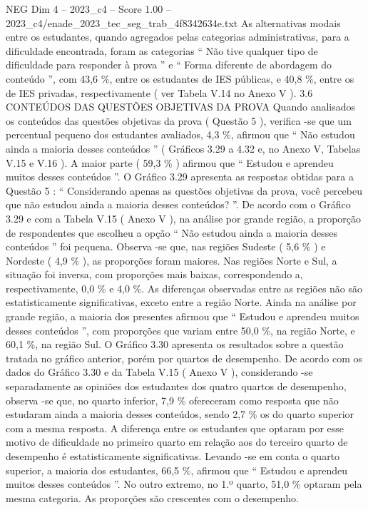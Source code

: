 \begin{textsample}{NEG Dim 4 – 2023\_c4 – Score 1.00 – 2023\_c4/enade\_2023\_tec\_seg\_trab\_4f8342634e.txt}
As alternativas modais entre os estudantes, quando agregados pelas categorias administrativas, para a dificuldade encontrada, foram as categorias “ Não tive qualquer tipo de dificuldade para responder à prova ” e “ Forma diferente de abordagem do conteúdo ”, com 43,6 \%, entre os estudantes de IES públicas, e 40,8 \%, entre os de IES privadas, respectivamente ( ver Tabela V.14 no Anexo V ). 3.6 CONTEÚDOS DAS QUESTÕES OBJETIVAS DA PROVA Quando analisados os conteúdos das questões objetivas da prova ( Questão 5 ), verifica -se que um percentual pequeno dos estudantes avaliados, 4,3 \%, afirmou que “ Não estudou ainda a maioria desses conteúdos ” ( Gráficos 3.29 a 4.32 e, no Anexo V, Tabelas V.15 e V.16 ).
A maior parte ( 59,3 \% ) afirmou que “ Estudou e aprendeu muitos desses conteúdos ”.
O Gráfico 3.29 apresenta as respostas obtidas para a Questão 5 : “ Considerando apenas as questões objetivas da prova, você percebeu que não estudou ainda a maioria desses conteúdos? ”.
De acordo com o Gráfico 3.29 e com a Tabela V.15 ( Anexo V ), na análise por grande região, a proporção de respondentes que escolheu a opção “ Não estudou ainda a maioria desses conteúdos ” foi pequena.
Observa -se que, nas regiões Sudeste ( 5,6 \% ) e Nordeste ( 4,9 \% ), as proporções foram maiores.
Nas regiões Norte e Sul, a situação foi inversa, com proporções mais baixas, correspondendo a, respectivamente, 0,0 \% e 4,0 \%.
As diferenças observadas entre as regiões não são estatisticamente significativas, exceto entre a região Norte.
Ainda na análise por grande região, a maioria dos presentes afirmou que “ Estudou e aprendeu muitos desses conteúdos ”, com proporções que variam entre 50,0 \%, na região Norte, e 60,1 \%, na região Sul.
O Gráfico 3.30 apresenta os resultados sobre a questão tratada no gráfico anterior, porém por quartos de desempenho.
De acordo com os dados do Gráfico 3.30 e da Tabela V.15 ( Anexo V ), considerando -se separadamente as opiniões dos estudantes dos quatro quartos de desempenho, observa -se que, no quarto inferior, 7,9 \% ofereceram como resposta que não estudaram ainda a maioria desses conteúdos, sendo 2,7 \% os do quarto superior com a mesma resposta.
A diferença entre os estudantes que optaram por esse motivo de dificuldade no primeiro quarto em relação aos do terceiro quarto de desempenho é estatisticamente significativas.
Levando -se em conta o quarto superior, a maioria dos estudantes, 66,5 \%, afirmou que “ Estudou e aprendeu muitos desses conteúdos ”.
No outro extremo, no 1.º quarto, 51,0 \% optaram pela mesma categoria.
As proporções são crescentes com o desempenho.

\end{textsample}
